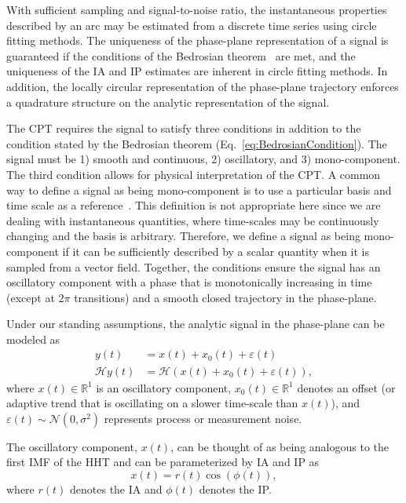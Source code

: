 \documentclass[11pt,draftcls,onecolumn]{IEEEtran}
\begin{document}
With sufficient sampling and signal-to-noise ratio, the instantaneous properties described by an arc may be estimated from a discrete time series using circle fitting methods. The uniqueness of the phase-plane representation of a signal is guaranteed if the conditions of the Bedrosian theorem~\cite{Bedrosian1963} are met, and the uniqueness of the IA and IP estimates are inherent in circle fitting methods. In addition, the locally circular representation of the phase-plane trajectory enforces a quadrature structure on the analytic representation of the signal.

The CPT requires the signal to satisfy three conditions in addition to the condition stated by the Bedrosian theorem (Eq.~\ref{eq:BedrosianCondition}). The signal must be 1) smooth and continuous, 2) oscillatory, and 3) mono-component. The third condition allows for physical interpretation of the CPT. A common way to define a signal as being mono-component is to use a particular basis and time scale as a reference~\cite{Boashash1992,Cohen1995}. This definition is not appropriate here since we are dealing with instantaneous quantities, where time-scales may be continuously changing and the basis is arbitrary. Therefore, we define a signal as being mono-component if it can be sufficiently described by a scalar quantity when it is sampled from a vector field. Together, the conditions ensure the signal has an oscillatory component with a phase that is monotonically increasing in time (except at $2\pi$ transitions) and a smooth closed trajectory in the phase-plane. 

Under our standing assumptions, the analytic signal in the phase-plane can be modeled as
\begin{align}\label{eq:SignalModel}
y\left( t \right) &= x\left( t \right) + x_0\left( t \right) + \varepsilon \left( t \right) \\
\mathcal{H}y\left( t \right) &= \mathcal{H}(x\left( t \right) + x_0\left( t \right) + \varepsilon \left( t \right)),
\end{align}
where $x(t) \in \mathbb{R}^1$ is an oscillatory component, $x_0(t) \in \mathbb{R}^1$ denotes an offset (or adaptive trend that is oscillating on a slower time-scale than $x(t)$), and $\varepsilon(t) \sim \mathcal{N}(0,\sigma^2)$ represents process or measurement noise. 

The oscillatory component, $x(t)$, can be thought of as being analogous to the first IMF of the HHT and can be parameterized by IA and IP as
\begin{equation}\label{eq:InstAmplitudeAndPhase}
    x\left( t \right) = r\left( t \right)\cos \left( {\phi \left( t \right)} \right),
\end{equation}
where $r(t)$ denotes the IA and $\phi(t)$ denotes the IP. 
\end{document}
